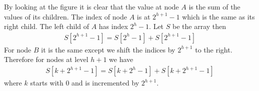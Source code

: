 \documentclass{article}
\begin{document}
    
By looking at the figure it is clear that the value at node $A$ is the sum of the values of its children.
The index of node $A$ is at $2^{h+1}-1$ which is the same as its right child. The left child of $A$ has index $2^h-1$. Let $S$ be the array then 
\begin{align*}
    S[2^{h+1}-1]=S[2^h-1]+S[2^{h+1}-1]
\end{align*}
For node $B$ it is the same except we shift the indices by $2^{h+1}$ to the right.
Therefore for nodes at level $h+1$ we have 
\begin{align*}
    S[k+2^{h+1}-1]=S[k+2^h-1]+S[k+2^{h+1}-1]
\end{align*}
where $k$ starts with 0 and is incremented by $2^{h+1}$.
\begin{algorithm*}
    \DontPrintSemicolon
\end{algorithm*}
\end{document}
